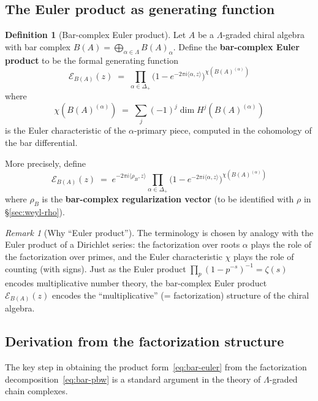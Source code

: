 \documentclass[11pt]{article}
\theoremstyle{definition}
\newtheorem{definition}[theorem]{Definition}
\theoremstyle{remark}
\newtheorem{remark}[theorem]{Remark}
\begin{document}
\subsection{The Euler product as generating function}

\begin{definition}[Bar-complex Euler product]
\label{def:bar-euler}
Let $A$ be a $\Lambda$-graded chiral algebra with bar complex
$B(A) = \bigoplus_{\alpha \in \Lambda} B(A)_\alpha$. Define the
\textbf{bar-complex Euler product} to be the formal generating function
\begin{equation}
\label{eq:bar-euler}
 \mathcal{E}_{B(A)}(z)
 \;=\;
 \prod_{\alpha \in \Delta_+}
 \bigl(1 - e^{-2\pi i\langle\alpha,z\rangle}\bigr)^{\chi(B(A)^{(\alpha)})}
\end{equation}
where
\[
 \chi(B(A)^{(\alpha)})
 \;=\;
 \sum_{j} (-1)^j \dim H^j(B(A)^{(\alpha)})
\]
is the Euler characteristic of the $\alpha$-primary piece, computed in
the cohomology of the bar differential.

More precisely, define
\begin{equation}
\label{eq:bar-euler-full}
 \mathcal{E}_{B(A)}(z)
 \;=\;
 e^{-2\pi i\langle\rho_B,z\rangle}
 \prod_{\alpha \in \Delta_+}
 \bigl(1 - e^{-2\pi i\langle\alpha,z\rangle}\bigr)^{\chi(B(A)^{(\alpha)})}
\end{equation}
where $\rho_B$ is the \textbf{bar-complex regularization vector}
(to be identified with $\rho$ in \S\ref{sec:weyl-rho}).
\end{definition}

\begin{remark}[Why ``Euler product'']
The terminology is chosen by analogy with the Euler product of a Dirichlet
series: the factorization over roots $\alpha$ plays the role of the
factorization over primes, and the Euler characteristic $\chi$ plays the
role of counting (with signs). Just as the Euler product
$\prod_p (1 - p^{-s})^{-1} = \zeta(s)$ encodes multiplicative number theory,
the bar-complex Euler product $\mathcal{E}_{B(A)}(z)$ encodes the
``multiplicative'' (= factorization) structure of the chiral algebra.
\end{remark}

\subsection{Derivation from the factorization structure}

The key step in obtaining the product form~\eqref{eq:bar-euler} from
the factorization decomposition~\eqref{eq:bar-pbw} is a standard
argument in the theory of $\Lambda$-graded chain complexes.
\end{document}
